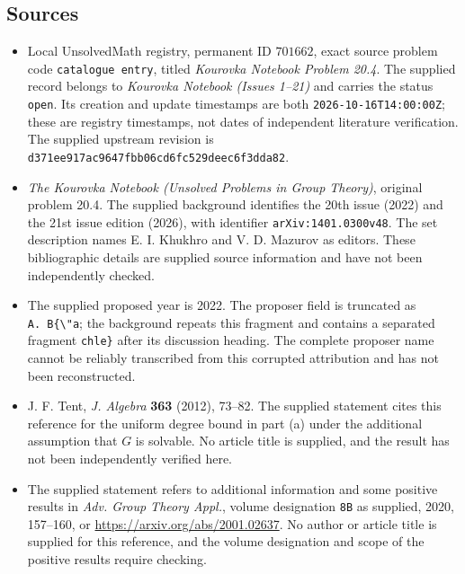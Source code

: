 \documentclass[11pt]{article}
\begin{document}
\subsection{Sources}
\begin{itemize}
\item Local UnsolvedMath registry, permanent ID \(701662\), exact source problem code \texttt{catalogue entry}, titled \emph{Kourovka Notebook Problem 20.4}. The supplied record belongs to \emph{Kourovka Notebook (Issues 1--21)} and carries the status \texttt{open}. Its creation and update timestamps are both \texttt{2026-10-16T14:00:00Z}; these are registry timestamps, not dates of independent literature verification. The supplied upstream revision is \texttt{d371ee917ac9647fbb06cd6fc529deec6f3dda82}.
\item \emph{The Kourovka Notebook (Unsolved Problems in Group Theory)}, original problem 20.4. The supplied background identifies the 20th issue (2022) and the 21st issue edition (2026), with identifier \texttt{arXiv:1401.0300v48}. The set description names E. I. Khukhro and V. D. Mazurov as editors. These bibliographic details are supplied source information and have not been independently checked.
\item The supplied proposed year is 2022. The proposer field is truncated as \texttt{A.\ B\{\textbackslash{}"a}; the background repeats this fragment and contains a separated fragment \texttt{chle\}} after its discussion heading. The complete proposer name cannot be reliably transcribed from this corrupted attribution and has not been reconstructed.
\item J. F. Tent, \emph{J. Algebra} \textbf{363} (2012), 73--82. The supplied statement cites this reference for the uniform degree bound in part (a) under the additional assumption that \(G\) is solvable. No article title is supplied, and the result has not been independently verified here.
\item The supplied statement refers to additional information and some positive results in \emph{Adv. Group Theory Appl.}, volume designation \texttt{8B} as supplied, 2020, 157--160, or \url{https://arxiv.org/abs/2001.02637}. No author or article title is supplied for this reference, and the volume designation and scope of the positive results require checking.
\end{itemize}
\end{document}
